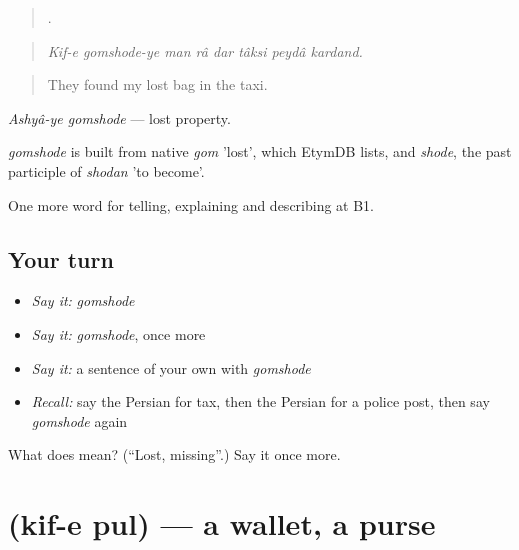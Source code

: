 \begin{quote}
       .
\end{quote}

\begin{quote}
\emph{Kif-e gomshode-ye man râ dar tâksi peydâ kardand.}
\end{quote}

\begin{quote}
They found my lost bag in the taxi.
\end{quote}

\emph{Ashyâ-ye gomshode} — lost property.

\begin{cousinweb}
\emph{gomshode} is built from native \emph{gom} 'lost', which EtymDB lists, and \emph{shode}, the past participle of \emph{shodan} 'to become'.
\end{cousinweb}

\begin{grammarlens}[title={What you've built}]
One more word for telling, explaining and describing at B1.
\end{grammarlens}

\subsection*{Your turn}
\begin{itemize}
\raggedright
  \item \emph{Say it:} \emph{gomshode}
  \item \emph{Say it:} \emph{gomshode}, once more
  \item \emph{Say it:} a sentence of your own with \emph{gomshode}
  \item \emph{Recall:} say the Persian for tax, then the Persian for a police post, then say \emph{gomshode} again
\end{itemize}

\begin{tcolorbox}[breakable,colback=teal!4,colframe=teal!35!black,title={Before you move on}]
What does  mean? (\textquotedblleft{}Lost, missing\textquotedblright{}.) Say it once more.
\end{tcolorbox}
\section[\texorpdfstring{\fa{کیف} \fa{پول} (kif-e pul)}{کیف پول (kif-e pul)}]{  (kif-e pul) — a wallet, a purse}

